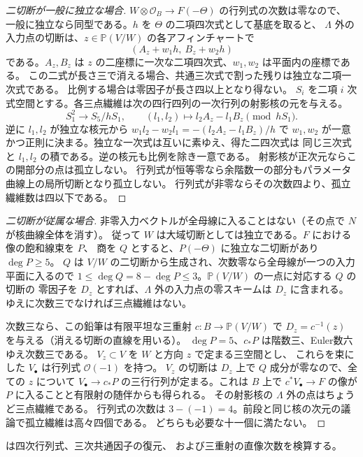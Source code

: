 \begin{proof}[二切断が一般に独立な場合]
$W\otimes\mathcal O_B\to F(-\Theta)$ の行列式の次数は零なので、
一般に独立なら同型である。$h$ を $\Theta$ の二項四次式として基底を取ると、
$\Lambda$ 外の入力点の切断は、$z\in\mathbb P(V/W)$ の各アフィンチャートで
\[
      (A_z+w_1 h,\ B_z+w_2 h)
\]
である。$A_z,B_z$ は $z$ の二座標に一次な二項四次式、$w_1,w_2$ は平面内の座標である。
この二式が長さ三で消える場合、共通三次式で割った残りは独立な二項一次式である。
比例する場合は零因子が長さ四以上となり得ない。
$S_i$ を二項 $i$ 次式空間とする。各三点繊維は次の四行四列の一次行列の射影核の元を与える。
\[
   S_1^2\longrightarrow S_5/hS_1,\qquad
   (l_1,l_2)\longmapsto l_2 A_z-l_1 B_z\pmod {h S_1}.
\]
逆に $l_1,l_2$ が独立な核元から $w_1 l_2-w_2 l_1=-(l_2A_z-l_1B_z)/h$ で
$w_1,w_2$ が一意かつ正則に決まる。独立な一次式は互いに素ゆえ、得た二四次式は
同じ三次式と $l_1,l_2$ の積である。逆の核元も比例を除き一意である。
射影核が正次元ならこの開部分の点は孤立しない。
行列式が恒等零なら余階数一の部分もパラメータ曲線上の局所切断となり孤立しない。
行列式が非零ならその次数四より、孤立繊維数は四以下である。

\end{proof}
\begin{proof}[二切断が従属な場合]
非零入力ベクトルが全母線に入ることはない（その点で $N$ が核曲線全体を消す）。
従って $W$ は大域切断としては独立である。$F$ における像の飽和線束を $P$、
商を $Q$ とすると、$P(-\Theta)$ に独立な二切断があり $\deg P\ge5$。
$Q$ は $V/W$ の二切断から生成され、次数零なら全母線が一つの入力平面に入るので
$1\le\deg Q=8-\deg P\le3$。$\mathbb P(V/W)$ の一点に対応する $Q$ の切断の
零因子を $D_z$ とすれば、$\Lambda$ 外の入力点の零スキームは $D_z$ に含まれる。
ゆえに次数三でなければ三点繊維はない。

次数三なら、この鉛筆は有限平坦な三重射 $c:B\to\mathbb P(V/W)$ で
$D_z=c^{-1}(z)$ を与える（消える切断の直線を用いる）。
$\deg P=5$、$c_*P$ は階数三、Euler数六ゆえ次数三である。
$V_z\subset V$ を $W$ と方向 $z$ で定まる三空間とし、
これらを束にした $V_\bullet$ は行列式 $\mathcal O(-1)$ を持つ。
$V_z$ の切断は $D_z$ 上で $Q$ 成分が零なので、全ての $z$ について
$V_\bullet\to c_*P$ の三行行列が定まる。これは $B$ 上で
$c^*V_\bullet\to F$ の像が $P$ に入ることと有限射の随伴からも得られる。
その射影核の $\Lambda$ 外の点はちょうど三点繊維である。
行列式の次数は $3-(-1)=4$。前段と同じ核の次元の議論で孤立繊維は高々四個である。
どちらも必要な十一個に満たない。
\end{proof}
 は四次行列式、三次共通因子の復元、
および三重射の直像次数を検算する。
